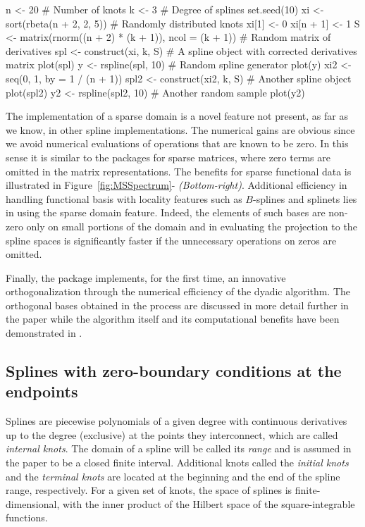 \begin{example}
n <- 20  # Number of knots
k <- 3   # Degree of splines
set.seed(10)
xi <- sort(rbeta(n + 2, 2, 5))  # Randomly distributed knots
xi[1] <- 0
xi[n + 1] <- 1 
S <- matrix(rnorm((n + 2) * (k + 1)), ncol = (k + 1))  # Random matrix of derivatives
spl <- construct(xi, k, S)  # A spline object with corrected derivatives matrix
plot(spl)
y <- rspline(spl, 10)  # Random spline generator
plot(y)
xi2 <- seq(0, 1, by = 1 / (n + 1))
spl2 <- construct(xi2, k, S)  # Another spline object
plot(spl2)
y2 <- rspline(spl2, 10)  # Another random sample
plot(y2)
\end{example}

The implementation of a sparse domain is a novel feature not present, as far as we know, in other spline implementations. 
The numerical gains are obvious since we avoid numerical evaluations of operations that are known to be zero. 
In this sense it is similar to the packages for sparse matrices, where zero terms are omitted in the matrix representations. 
The benefits for sparse functional data is illustrated in Figure~\ref{fig:MSSpectrum}-\emph{ (Bottom-right)}.
Additional efficiency in handling functional basis with locality features such as $B$-splines and splinets lies in using the sparse domain feature. 
Indeed, the elements of such bases are non-zero only on small portions of the domain and in evaluating the projection to the spline spaces is significantly faster if the unnecessary operations on zeros are omitted. 

Finally, the package implements, for the first time, an innovative orthogonalization through the numerical efficiency of the dyadic algorithm.
The orthogonal bases obtained in the process are discussed in more detail further in the paper while the algorithm itself and its computational benefits have been demonstrated in \citep{LIU2022}. 


\vspace{-.13cm}
\subsection{Splines with zero-boundary conditions at the endpoints}
\vspace{-.22cm}
Splines are piecewise polynomials of a given {  degree with continuous derivatives up to the degree} (exclusive) at the points they interconnect, which are called \emph{ internal knots}. 
The domain of a spline will be called its \emph{ range} and is assumed in the paper to be a closed finite interval. 
Additional knots called the  \emph{ initial knots} and the \emph{ terminal knots} are located at the beginning and the end of the spline range, respectively.
For a given set of knots, the space of splines is finite-dimensional, with the inner product of the Hilbert space of the square-integrable functions. 


